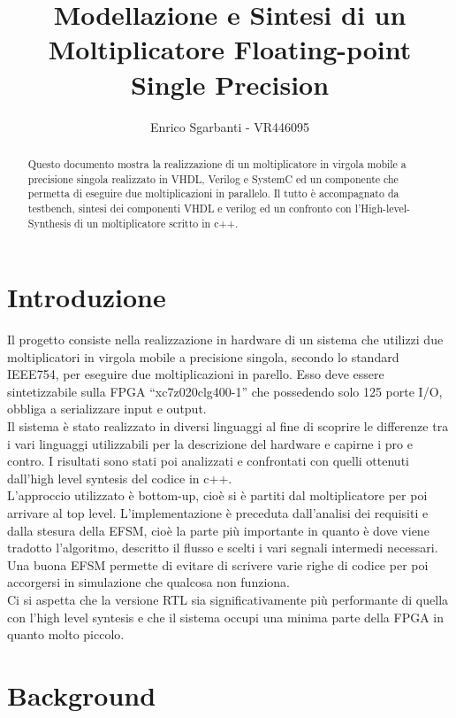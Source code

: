 \documentclass[]{IEEEtran}
\title{Modellazione e Sintesi di un Moltiplicatore Floating-point Single Precision}
\author{Enrico Sgarbanti - VR446095}
\begin{document}
\maketitle



\begin{abstract}
    Questo documento mostra la realizzazione di un moltiplicatore in virgola mobile a precisione singola realizzato in VHDL, Verilog e SystemC ed un componente che permetta di eseguire due moltiplicazioni in parallelo. Il tutto è accompagnato da testbench, sintesi dei componenti VHDL e verilog ed un confronto con l'High-level-Synthesis di un moltiplicatore scritto in c++.
\end{abstract}



\section{Introduzione}
Il progetto consiste nella realizzazione in hardware di un sistema che utilizzi due moltiplicatori in virgola mobile a precisione singola, secondo lo standard IEEE754, per eseguire due moltiplicazioni in parello. Esso deve essere sintetizzabile sulla FPGA ``xc7z020clg400-1'' che possedendo solo 125 porte I/O, obbliga a serializzare input e output.
\\Il sistema è stato realizzato in diversi linguaggi al fine di scoprire le differenze tra i vari linguaggi utilizzabili per la descrizione del hardware e capirne i pro e contro. I risultati sono stati poi analizzati e confrontati con quelli ottenuti dall'high level syntesis del codice in c++.
\\L'approccio utilizzato è bottom-up, cioè si è partiti dal moltiplicatore per poi arrivare al top level. L'implementazione è preceduta dall'analisi dei requisiti e dalla stesura della EFSM, cioè la parte più importante in quanto è dove viene tradotto l'algoritmo, descritto il flusso e scelti i vari segnali intermedi necessari. Una buona EFSM permette di evitare di scrivere varie righe di codice per poi accorgersi in simulazione che qualcosa non funziona.
\\Ci si aspetta che la versione RTL sia significativamente più performante di quella con l'high level syntesis e che il sistema occupi una minima parte della FPGA in quanto molto piccolo.



\section{Background}
\end{document}
